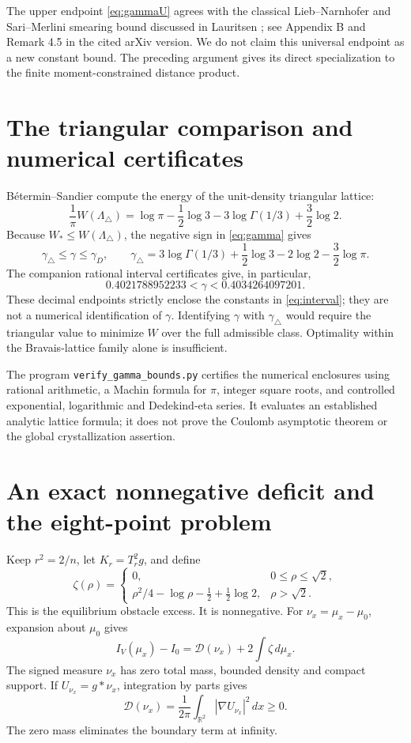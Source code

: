 \documentclass[11pt,a4paper]{article}
\theoremstyle{remark}
\newcommand{\R}{\mathbb R}
\newcommand{\dd}{\,d}
\newcommand{\D}{\mathcal D}
\numberwithin{equation}{section}
\begin{document}
The upper endpoint \eqref{eq:gammaU} agrees with the classical
Lieb--Narnhofer and Sari--Merlini smearing bound discussed in
Lauritsen \cite{Lau}; see Appendix B and Remark 4.5 in the cited
arXiv version. We do not claim this universal endpoint as a new
constant bound. The preceding argument gives its direct specialization
to the finite moment-constrained distance product.

\section{The triangular comparison and numerical certificates}
B\'etermin--Sandier \cite[Section 7.3]{BS} compute the energy of the
unit-density triangular lattice:
\[
 \frac1\pi W(\Lambda_\triangle)
  =\log\pi-\frac12\log3-3\log\Gamma(1/3)+\frac32\log2 .
\]
Because \(W_*\le W(\Lambda_\triangle)\), the negative sign in
\eqref{eq:gamma} gives
\begin{equation}\label{eq:interval}
 \gamma_\triangle\le\gamma\le\gamma_D,\qquad
 \gamma_\triangle=
 3\log\Gamma(1/3)+\frac12\log3-2\log2-\frac32\log\pi.
\end{equation}
The companion rational interval certificates give, in particular,
\[
 \boxed{\quad
 0.4021788952233<\gamma<0.4034264097201 .
 \quad}
\]
These decimal endpoints strictly enclose the constants in
\eqref{eq:interval}; they are not a numerical identification of
\(\gamma\). Identifying \(\gamma\) with \(\gamma_\triangle\) would require
the triangular value to minimize \(W\) over the full admissible class.
Optimality within the Bravais-lattice family alone is insufficient.

The program \texttt{verify\_gamma\_bounds.py} certifies the numerical
enclosures using rational arithmetic, a Machin formula for \(\pi\),
integer square roots, and controlled exponential, logarithmic and
Dedekind-eta series. It evaluates an established analytic lattice
formula; it does not prove the Coulomb asymptotic theorem or the
global crystallization assertion.

\section{An exact nonnegative deficit and the eight-point problem}
Keep \(r^2=2/n\), let \(K_r=T_r^2g\), and define
\begin{equation}\label{eq:zeta}
 \zeta(\rho)=
 \begin{cases}
 0,&0\le\rho\le\sqrt2,\\
 \rho^2/4-\log\rho-\frac12+\frac12\log2,&\rho>\sqrt2.
 \end{cases}
\end{equation}
This is the equilibrium obstacle excess. It is nonnegative.
For \(\nu_x=\mu_x-\mu_0\), expansion about \(\mu_0\) gives
\begin{equation}\label{eq:meanfielddeficit}
 I_V(\mu_x)-I_0=\D(\nu_x)+2\int\zeta\dd\mu_x.
\end{equation}
The signed measure \(\nu_x\) has zero total mass, bounded density and
compact support. If \(U_{\nu_x}=g*\nu_x\), integration by parts gives
\[
 \D(\nu_x)=\frac1{2\pi}\int_{\R^2}|\nabla U_{\nu_x}|^2\dd x\ge0.
\]
The zero mass eliminates the boundary term at infinity.
\end{document}
